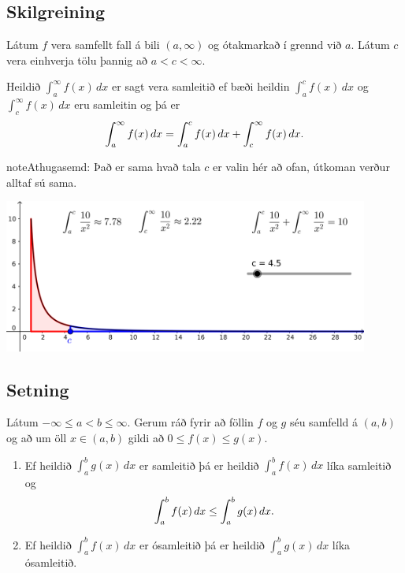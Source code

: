 \documentclass[b5paper,10pt,icelandic]{sphinxmanual}
\begin{document}
\subsection{Skilgreining}
\label{kafli06:id10}
Látum \(f\) vera samfellt fall á bili \((a,\infty)\) og
ótakmarkað í grennd við \(a\). Látum \(c\) vera einhverja tölu
þannig að \(a<c<\infty\).

Heildið \(\int_a^\infty f(x)\,dx\) er sagt vera samleitið ef bæði
heildin \(\int_a^c f(x)\,dx\) og \(\int_c^\infty f(x)\,dx\) eru
samleitin og þá er
\begin{gather}
\begin{split}\int_{a}^\infty f(x)\,dx=\int_{a}^c f(x)\,dx + \int_c^\infty f(x)\,dx.\end{split}\notag
\end{gather}
\begin{notice}{note}{Athugasemd:}
Það er sama hvað tala \(c\) er valin hér að ofan, útkoman verður
alltaf sú sama.
\end{notice}


\begin{center}
\includegraphics[width=12cm,keepaspectratio=true]{07_samleitidheildi.png}
\end{center}



\subsection{Setning}
\label{kafli06:id11}
Látum \(-\infty\leq a<b\leq \infty\). Gerum ráð fyrir að föllin
\(f\) og \(g\) séu samfelld á \((a, b)\) og að um öll
\(x\in (a, b)\) gildi að \(0\leq f(x)\leq g(x)\).
\begin{enumerate}
\item {} 
Ef heildið \(\int_a^b g(x)\,dx\) er samleitið þá er heildið
\(\int_a^b f(x)\,dx\) líka samleitið og
\begin{gather}
\begin{split}\int_a^b f(x)\,dx \leq \int_a^b g(x)\,dx.\end{split}\notag
\end{gather}
\item {} 
Ef heildið \(\int_a^b f(x)\,dx\) er ósamleitið þá er heildið
\(\int_a^b g(x)\,dx\) líka ósamleitið.

\end{enumerate}
\end{document}
